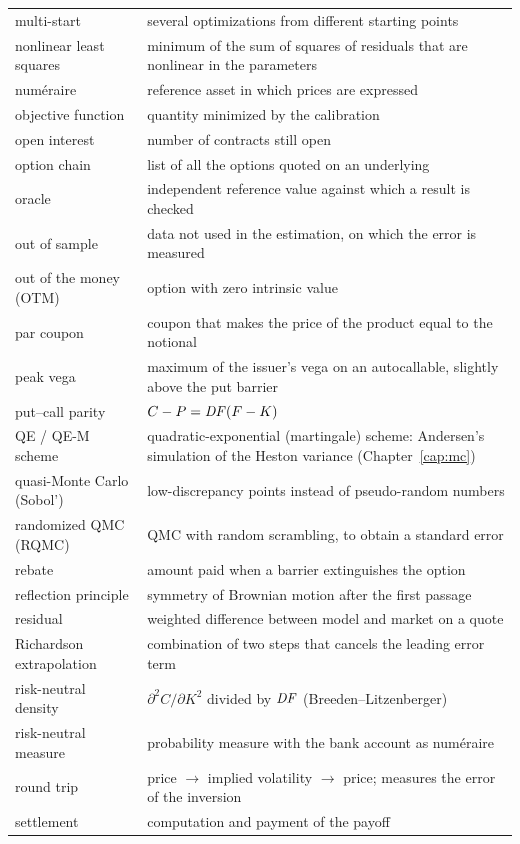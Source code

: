 \begin{small}
\begin{longtable}{@{}>{\raggedright\arraybackslash}p{}%
  >{\raggedright\arraybackslash}p{}@{}}
multi-start & several optimizations from different starting points\\
nonlinear least squares & minimum of the sum of squares of residuals that are nonlinear in the parameters\\
numéraire & reference asset in which prices are expressed\\
objective function & quantity minimized by the calibration\\
open interest & number of contracts still open\\
option chain & list of all the options quoted on an underlying\\
oracle & independent reference value against which a result is checked\\
out of sample & data not used in the estimation, on which the error is measured\\
out of the money (OTM) & option with zero intrinsic value\\
par coupon & coupon that makes the price of the product equal to the notional\\
peak vega & maximum of the issuer's vega on an autocallable, slightly above the put barrier\\
put--call parity & $C-P=\mathit{DF}(F-K)$\\
QE / QE-M scheme & quadratic-exponential (martingale) scheme: Andersen's simulation of the Heston variance (Chapter~\ref{cap:mc})\\
quasi-Monte Carlo (Sobol') & low-discrepancy points instead of pseudo-random numbers\\
randomized QMC (RQMC) & QMC with random scrambling, to obtain a standard error\\
rebate & amount paid when a barrier extinguishes the option\\
reflection principle & symmetry of Brownian motion after the first passage\\
residual & weighted difference between model and market on a quote\\
Richardson extrapolation & combination of two steps that cancels the leading error term\\
risk-neutral density & $\partial^2C/\partial K^2$ divided by $\mathit{DF}$ (Breeden--Litzenberger)\\
risk-neutral measure & probability measure with the bank account as numéraire\\
round trip & price $\to$ implied volatility $\to$ price; measures the error of the inversion\\
settlement & computation and payment of the payoff\\

\end{longtable}
\end{small}
